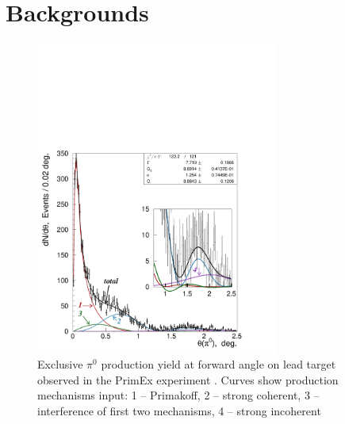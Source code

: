 
\section{Backgrounds}

\begin{figure}[tbp]
\begin{center}
\includegraphics[width=8cm,angle=0,trim={1.5cm 0.5cm 3.5cm 9.5cm},clip]{figures/dndt_pb_partial.pdf}
\end{center}
\caption{Exclusive $\pi^0$ production yield at forward angle on lead target
observed in the PrimEx experiment \cite{Larin:2010kq}. Curves show production mechanisms input:
1 -- Primakoff, 2 -- strong coherent, 3 -- interference of first two mechanisms, 4 -- strong incoherent}
\label{fig:leaddndt}
\end{figure}




